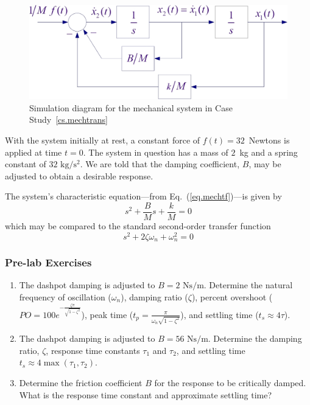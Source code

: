 \begin{figure}[bht]
\centering
\includegraphics[width=.6\textwidth]{mechsimdiagram}
\caption{\footnotesize
        Simulation diagram for the mechanical system in Case Study~\ref{cs.mechtrans}
        \label{fig.mechsimdiagram}
        }
\end{figure}

With the system initially at rest, a constant force of $f(t) = 32$~Newtons is applied at time $t=0$.  The system in question has a mass of $2$~kg and a spring constant of $32\mbox{ kg}/\mbox{s}^2$.  We are told that the damping coefficient, $B$, may be adjusted to obtain a desirable response.
\par
The system's characteristic equation---from Eq.\ (\ref{eq.mechtf})---is given by
\begin{equation}
    s^2 + \frac{B}{M} s + \frac{k}{M} = 0
\end{equation}
which may be compared to the standard second-order transfer function
\begin{equation}
    s^2 + 2 \zeta \omega_n + \omega_n^2 = 0
\end{equation}

\subsubsection{Pre-lab Exercises}
\begin{enumerate}
\item
    The dashpot damping is adjusted to $B = 2\mbox{ Ns/m}$.  Determine the natural frequency of oscillation ($\omega_n$), damping ratio ($\zeta$), percent overshoot ($PO = 100e^{-\frac{\zeta\pi}{\sqrt{1-\zeta^2}}}$), peak time ($t_p = \frac{\pi}{\omega_n \sqrt{1-\zeta^2}}$), and settling time ($t_s \approx 4\tau$).
\item
    The dashpot damping is adjusted to $B = 56\mbox{ Ns/m}$.  Determine the damping ratio, $\zeta$, response time constants $\tau_1$ and $\tau_2$, and settling time $t_s \approx 4\max\left(\tau_1,\tau_2\right)$.
\item
    Determine the friction coefficient $B$ for the response to be critically damped.  What is the response time constant and approximate settling time?
\end{enumerate}

